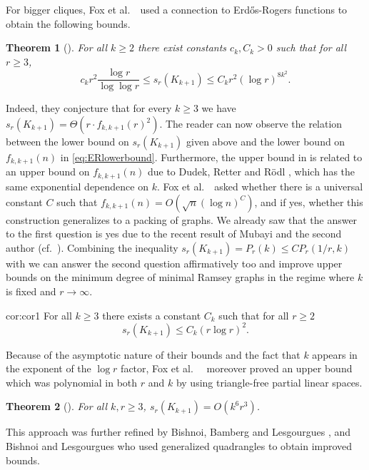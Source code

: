 \documentclass[12pt]{article}
\newtheorem{theorem}{Theorem}
\theoremstyle{definition}
\begin{document}
	For bigger cliques, Fox et al.\ \ used a connection to Erd\H{o}s-Rogers functions to obtain the following bounds. 
	
	\begin{theorem}[\cite{fox2016minimum}]\label{thm:foxetal}
		For all $k \geq 2$ there exist constants $c_k, C_k > 0$ such that for all $r \geq 3$,
		\[c_kr^2\frac{\log r}{\log\log r} \leq s_r(K_{k+1}) \leq C_kr^2(\log r)^{8k^2}.\] 
	\end{theorem}
	
	Indeed, they conjecture \cite[Conjecture 5.2]{Foxetal} that for every $k \geq 3$ we have $s_r(K_{k+1}) = \Theta(r\cdot f_{k,k+1}(r)^2)$. The reader can now observe the relation between the lower bound on $s_r(K_{k+1})$ given above and the lower bound on $f_{k,k+1}(n)$ in \eqref{eq:ERlowerbound}. Furthermore, the upper bound in  is related to an upper bound on $f_{k,k+1}(n)$ due to Dudek, Retter and R\"odl \cite{DRR14}, which has the same exponential dependence on $k$. Fox et al.\ \ asked \cite[Question 5.3]{Foxetal} whether there is a universal constant $C$ such that $f_{k,k+1}(n) = O(\sqrt{n}(\log n)^C)$, and if yes, whether this construction generalizes to a packing of graphs. We already saw that the answer to the first question is yes due to the recent result of Mubayi and the second author (cf.\ ). Combining the inequality $s_r(K_{k+1}) = P_r(k) \leq CP_r(1/r,k)$ with  we can answer the second question affirmatively too and improve upper bounds on the minimum degree of minimal Ramsey graphs in the regime where $k$ is fixed and $r \to \infty$.
	
	\begin{repcorollary}{cor:cor1}
		For all $k \geq 3$ there exists a constant $C_k$ such that for all $r \geq 2$
		\[s_r(K_{k+1}) \leq C_k (r\log r)^2. \]
	\end{repcorollary}
	
	Because of the asymptotic nature of their bounds and the fact that $k$ appears in the exponent of the $\log r$ factor, Fox et al.\ \ \cite{fox2016minimum} moreover proved an upper bound which was polynomial in both $r$ and $k$ by using triangle-free partial linear spaces.
	
	\begin{theorem}[\cite{fox2016minimum}]
		For all $k,r \geq 3$, $s_r(K_{k+1}) = O(k^6r^3)$.
	\end{theorem}
	
	This approach was further refined by Bishnoi, Bamberg and Lesgourgues \cite{bamberg2022minimum}, and Bishnoi and Lesgourgues \cite{bishnoi2022new} who used generalized quadrangles to obtain improved bounds.
	
\end{document}

